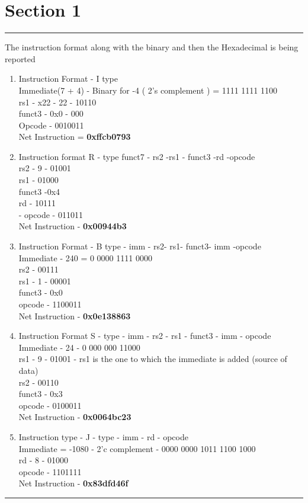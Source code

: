 \section {Section 1}

\vspace{5pt}
\hrule
\vspace{10pt}
The instruction format along with the binary and then the Hexadecimal is being
reported
\begin{enumerate}
    \item 
     Instruction Format  - I type 
     \\ Immediate(7 + 4) - Binary for -4 ( 2's complement ) = 1111 1111 1100
     \\ rs1 - x22  - 22  - 10110
     \\ funct3 - 0x0 - 000
     \\ Opcode - 0010011
    \\ Net Instruction = \textbf{0xffcb0793}
    \item Instruction format R - type funct7 - rs2 -rs1 - funct3 -rd -opcode 
    \\ rs2 - 9 - 01001
    \\ rs1 - 01000
    \\ funct3 -0x4
    \\ rd - 10111
    \\ - opcode - 011011
    \\ Net Instruction - \textbf{0x00944b3}   
    \item Instruction Format - B type - imm  - rs2- rs1- funct3- imm -opcode
    \\Immediate - 240 =  0 0000 1111 0000
    \\ rs2 - 00111 
    \\ rs1 - 1 - 00001
    \\funct3 - 0x0
    \\opcode - 1100011
    \\ Net Instruction - \textbf{0x0e138863}
    \item Instruction Format S - type - imm - rs2 - rs1 - funct3 - imm - opcode
    \\ Immediate - 24 -  0 000 000 11000
    \\ rs1 - 9 - 01001 - rs1 is the one to which the immediate is added (source of data)
    \\ rs2 - 00110
    \\ funct3 - 0x3
    \\ opcode - 0100011
    \\ Net Instruction  - \textbf{0x0064bc23}
    \item Instruction type - J - type - imm - rd - opcode
    \\ Immediate  = -1080  - 2'c complement -  0000 0000 1011 1100 1000
    \\rd - 8 - 01000
    \\ opcode - 1101111 
    \\ Net Instruction - \textbf{0x83dfd46f}
\end{enumerate}
\vspace{7pt}
\hrule
